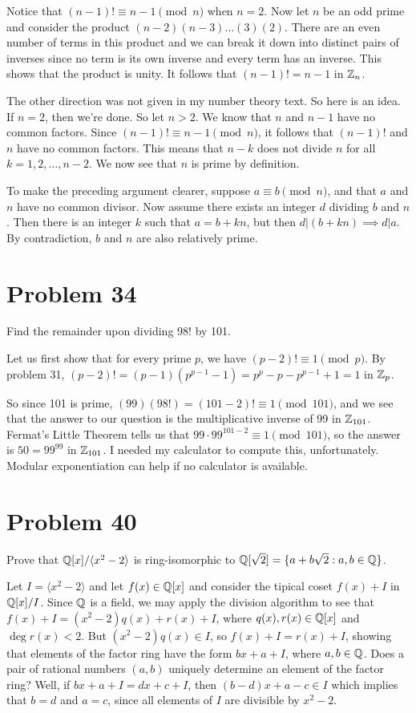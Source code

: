 \documentclass{article}
\begin{document}
Notice that $(n-1)!\equiv n-1\pmod{n}$ when $n=2$.
Now let $n$ be an odd prime and consider the product $(n-2)(n-3)\dots (3)(2)$.
There are an even number of terms in this product and we can break it down
into distinct pairs of inverses since no term is its own inverse and every
term has an inverse.
This shows that the product is unity.  It follows that $(n-1)!=n-1$ in $\mathbb{Z}_n$.

The other direction was not given in my number theory text.
So here is an idea.  If $n=2$, then we're done.  So let $n>2$.
We know that $n$ and $n-1$ have no common factors.
Since $(n-1)!\equiv n-1\pmod{n}$, it follows that $(n-1)!$
and $n$ have no common factors.  This means that $n-k$ does
not divide $n$ for all $k=1,2,\dots,n-2$.  We now see that $n$
is prime by definition.

To make the preceding argument clearer, suppose $a\equiv b\pmod{n}$,
and that $a$ and $n$ have no common divisor.  Now assume there exists an
integer $d$ dividing $b$ and $n$.  Then there is an integer $k$ such that
$a=b+kn$, but then $d|(b+kn)\implies d|a$.  By contradiction, $b$ and $n$
are also relatively prime.

\section*{Problem 34}

Find the remainder upon dividing $98!$ by 101.

Let us first show that for every prime $p$, we have $(p-2)!\equiv 1\pmod{p}$.
By problem 31, $(p-2)!=(p-1)(p^{p-1}-1)=p^p-p-p^{p-1}+1=1$ in $\mathbb{Z}_p$.

So since 101 is prime,
$(99)(98!)=(101-2)!\equiv 1\pmod{101}$, and we see that the
answer to our question is the multiplicative inverse of 99 in $\mathbb{Z}_{101}$.
Fermat's Little Theorem tells us that $99\cdot 99^{101-2}\equiv 1\pmod{101}$,
so the answer is $50=99^{99}$ in $\mathbb{Z}_{101}$.  I needed my calculator to
compute this, unfortunately.  Modular exponentiation can help if no
calculator is available.

\section*{Problem 40}

Prove that $\mathbb{Q}[x]/\langle x^2-2\rangle$ is ring-isomorphic to
$\mathbb{Q}[\sqrt{2}]=\{a+b\sqrt{2}:a,b\in\mathbb{Q}\}$.

Let $I=\langle x^2-2\rangle$ and let $f(x)\in\mathbb{Q}[x]$ and consider the tipical
coset $f(x)+I$ in $\mathbb{Q}[x]/I$.
Since $\mathbb{Q}$ is a field, we may apply the division algorithm to see
that $f(x)+I=(x^2-2)q(x)+r(x)+I$,
where $q(x),r(x)\in\mathbb{Q}[x]$ and $\deg r(x)<2$.
But $(x^2-2)q(x)\in I$, so
$f(x)+I=r(x)+I$, showing
that elements of the factor ring have the form $bx+a+I$,
where $a,b\in\mathbb{Q}$.  Does a pair of rational numbers $(a,b)$ uniquely determine
an element of the factor ring?
Well, if $bx+a+I=dx+c+I$, then
$(b-d)x+a-c\in I$ which implies that $b=d$ and $a=c$, since all elements
of $I$ are divisible by $x^2-2$.
\end{document}
